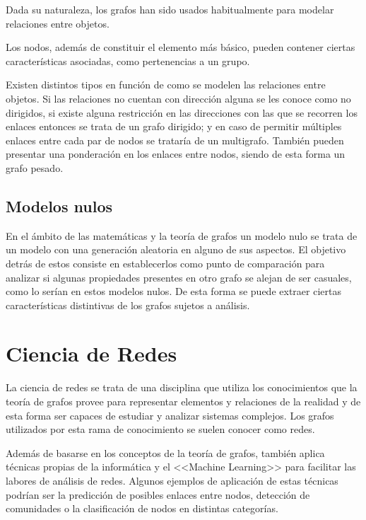Dada su naturaleza, los grafos han sido usados habitualmente para modelar relaciones entre objetos.

Los nodos, además de constituir el elemento más básico, pueden contener ciertas características asociadas, como pertenencias a un grupo.

Existen distintos tipos en función de como se modelen las relaciones entre objetos. Si las relaciones no cuentan con dirección alguna se les conoce como no dirigidos, si existe alguna restricción en las direcciones con las que se recorren los enlaces entonces se trata de un grafo dirigido; y en caso de permitir múltiples enlaces entre cada par de nodos se trataría de un multigrafo. También pueden presentar una ponderación en los enlaces entre nodos, siendo de esta forma un grafo pesado.

\subsection{Modelos nulos}

En el ámbito de las matemáticas y la teoría de grafos un modelo nulo se trata de un modelo con una generación aleatoria en alguno de sus aspectos. El objetivo detrás de estos consiste en establecerlos como punto de comparación para analizar si algunas propiedades presentes en otro grafo se alejan de ser casuales, como lo serían en estos modelos nulos. De esta forma se puede extraer ciertas características distintivas de los grafos sujetos a análisis.

\section{Ciencia de Redes}
La ciencia de redes se trata de una disciplina que utiliza los conocimientos que la teoría de grafos provee para representar elementos y relaciones de la realidad y de esta forma ser capaces de estudiar y analizar sistemas complejos. Los grafos utilizados por esta rama de conocimiento se suelen conocer como redes.

Además de basarse en los conceptos de la teoría de grafos, también aplica técnicas propias de la informática y el <<Machine Learning>> para facilitar las labores de análisis de redes. Algunos ejemplos de aplicación de estas técnicas podrían ser la predicción de posibles enlaces entre nodos, detección de comunidades o la clasificación de nodos en distintas categorías.

